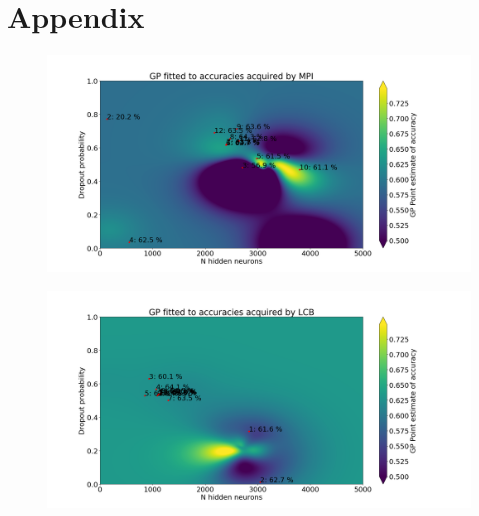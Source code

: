 \documentclass[12pt,fleqn]{article}
\begin{document}
\section{Appendix}
\begin{figure}[H]

		\includegraphics[width=\textwidth]{MPIGP}	
\end{figure}
\begin{figure}[H]
		\includegraphics[width=\textwidth]{LCBGP}	

\end{figure}
\end{document}
